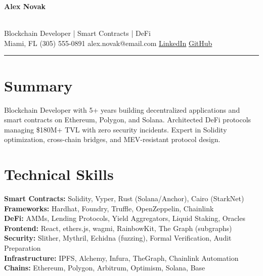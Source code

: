 \documentclass[10pt,a4paper]{article}
\begin{document}
\noindent{}
\hspace{4pt}
{\fontsize{20}{24}\selectfont\bfseries\color{darkaccent}Alex Novak}
\hfill
{}\\[4pt]
{\small\color{accent}Blockchain Developer | Smart Contracts | DeFi}\\[3pt]
{\small Miami, FL \quad\textbar\quad (305) 555-0891 \quad\textbar\quad alex.novak@email.com \quad\textbar\quad \href{https://linkedin.com/in/alexnovak-web3}{LinkedIn} \quad\textbar\quad \href{https://github.com/anovak-sol}{GitHub}}

\vspace{2pt}
{\color{accent}\rule{\textwidth}{1.5pt}}

\section{Summary}
Blockchain Developer with 5+ years building decentralized applications and smart contracts on Ethereum, Polygon, and Solana. Architected DeFi protocols managing \$180M+ TVL with zero security incidents. Expert in Solidity optimization, cross-chain bridges, and MEV-resistant protocol design.

\section{Technical Skills}
\textbf{Smart Contracts:} Solidity, Vyper, Rust (Solana/Anchor), Cairo (StarkNet)\\
\textbf{Frameworks:} Hardhat, Foundry, Truffle, OpenZeppelin, Chainlink\\
\textbf{DeFi:} AMMs, Lending Protocols, Yield Aggregators, Liquid Staking, Oracles\\
\textbf{Frontend:} React, ethers.js, wagmi, RainbowKit, The Graph (subgraphs)\\
\textbf{Security:} Slither, Mythril, Echidna (fuzzing), Formal Verification, Audit Preparation\\
\textbf{Infrastructure:} IPFS, Alchemy, Infura, TheGraph, Chainlink Automation\\
\textbf{Chains:} Ethereum, Polygon, Arbitrum, Optimism, Solana, Base
\end{document}
